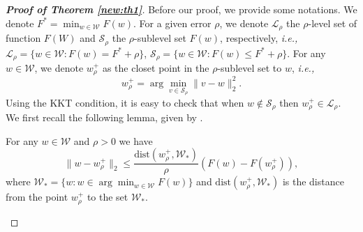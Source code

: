\documentclass[12pt]{alt2022} %
\begin{document}
	\begin{proof}[ {\bf Proof of Theorem \ref{new:th1}}]
	 	  Before our proof, we provide some notations. We denote $F^*=\min_{w\in\mathcal{W}}F(w)$. For a given error $\rho$, we denote $\mathcal{L}_\rho$ the $\rho$-level set of  function $F(W)$ and $\mathcal{S}_\rho$  the $\rho$-sublevel set $F(w)$, respectively, {\em i.e.,} $\mathcal{L}_\rho=\{w\in \mathcal{W}: F(w)=F^*+\rho\}$, $\mathcal{S}_\rho=\{w\in\mathcal{W}: F(w)\leq F^*+\rho\}$. For any $w\in \mathcal{W}$, we denote $w^{+}_\rho$ as the closet point in the $\rho$-sublevel set to $w$, {\em i.e.,} 
	  \begin{equation*}
	      w^{+}_\rho=\arg\min_{v\in \mathcal{S}_\rho}\|v-w\|_2^2. 
	  \end{equation*}
	    Using the KKT condition, it is easy to check that when $w\not\in \mathcal{S}_\rho$ then $w^{+}_\rho \in \mathcal{L}_\rho$. We first recall the following lemma, given by \citep{yang2018rsg}. 
	    \begin{lemma}\label{lemma:15}
	     For any $w\in\mathcal{W}$ and $\rho>0$ we have 
	     \begin{equation*}
	         \|w-w^{+}_\rho\|_2\leq \frac{\text{dist}(w^{+}_\rho, \mathcal{W}_*) }{\rho} (F(w)-F(w^+_\rho)),
	     \end{equation*}
	     	    where $\mathcal{W}_*=\{w: w\in \arg\min_{w\in \mathcal{W}}F(w)\}$ and $\text{dist}(w^{+}_\rho, \mathcal{W}_*)$ is the distance from the point $w^+_\rho$ to the set $ \mathcal{W}_*$. 
	    \end{lemma}


\end{proof}
\end{document}
